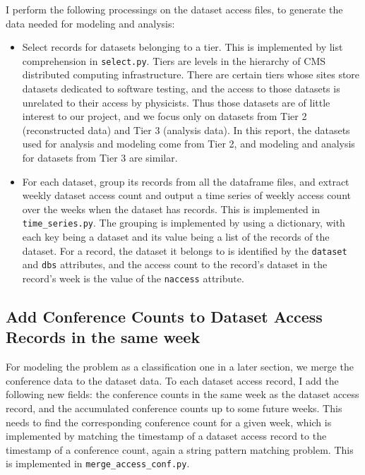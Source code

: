 \documentclass[preprint, 12pt]{elsarticle}
\begin{document}
I perform the following processings on the dataset access files, to generate the data needed for modeling and analysis:

\begin{itemize}
  
\item Select records for datasets belonging to a tier.
This is implemented by list comprehension in \verb|select.py|.
Tiers are levels in the hierarchy of CMS distributed computing infrastructure. 
There are certain tiers whose sites store datasets dedicated to software testing, and the access to those datasets is unrelated to their access by physicists. Thus those  datasets are of little interest to our project, and we focus only on datasets from Tier 2 (reconstructed data) and Tier 3 (analysis data).
In this report, the datasets used for analysis and modeling come from Tier 2, and modeling and analysis for datasets from Tier 3 are similar.

\item For each dataset, group its records from all the dataframe files, and extract weekly dataset access count and output a time series of weekly access count over the weeks when the dataset has records.
This is implemented in \verb|time_series.py|.
The grouping is implemented by using a dictionary, with each key being a dataset and its value being a list of the records of the dataset.
For a record, the dataset it belongs to is identified by the \verb|dataset| and \verb|dbs| attributes,
and the access count to the record's dataset in the record's week is the value of the \verb|naccess| attribute.


\end{itemize}

\subsection{Add Conference Counts to Dataset Access Records in the same week}

For modeling the problem as a classification one in a later section, we merge the conference data to the dataset data.
To each dataset access record, I add the following new fields: the conference counts in the same week as the dataset access record, and the accumulated conference counts up to some future weeks.
This needs to find the corresponding conference count for a given week, which is implemented by matching the timestamp of a dataset access record to the timestamp of a conference count, again a string pattern matching problem.
This is implemented in \verb|merge_access_conf.py|.
\end{document}
